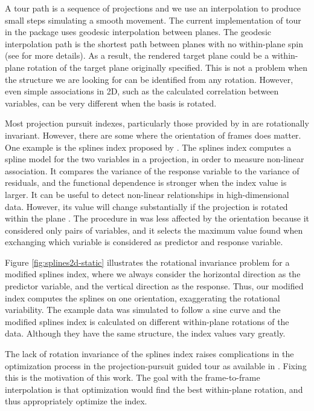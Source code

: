 A tour path is a sequence of projections and we use an interpolation to
produce small steps simulating a smooth movement. The current
implementation of tour in the  package uses geodesic
interpolation between planes. The geodesic interpolation path is the
shortest path between planes with no within-plane spin (see
\citet{Buja2004TheoryOD} for more details). As a result, the rendered
target plane could be a within-plane rotation of the target plane
originally specified. This is not a problem when the structure we are
looking for can be identified from any rotation. However, even simple
associations in 2D, such as the calculated correlation between
variables, can be very different when the basis is rotated.

Most projection pursuit indexes, particularly those provided by in
 are rotationally invariant. However, there are some
where the orientation of frames does matter. One example is the splines
index proposed by \citet{Grimm2016}. The splines index computes a spline
model for the two variables in a projection, in order to measure
non-linear association. It compares the variance of the response
variable to the variance of residuals, and the functional dependence is
stronger when the index value is larger. It can be useful to detect
non-linear relationships in high-dimensional data. However, its value
will change substantially if the projection is rotated within the plane
\citep{pp}. The procedure in \citet{Grimm2016} was less affected by the
orientation because it considered only pairs of variables, and it
selects the maximum value found when exchanging which variable is
considered as predictor and response variable.

Figure \ref{fig:splines2d-static} illustrates the rotational invariance
problem for a modified splines index, where we always consider the
horizontal direction as the predictor variable, and the vertical
direction as the response. Thus, our modified index computes the splines
on one orientation, exaggerating the rotational variability. The example
data was simulated to follow a sine curve and the modified splines index
is calculated on different within-plane rotations of the data. Although
they have the same structure, the index values vary greatly.

The lack of rotation invariance of the splines index raises
complications in the optimization process in the projection-pursuit
guided tour as available in . Fixing this is the
motivation of this work. The goal with the frame-to-frame interpolation
is that optimization would find the best within-plane rotation, and thus
appropriately optimize the index.

